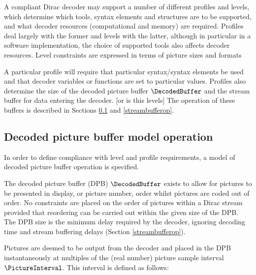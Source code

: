 \label{profilelevel}

A compliant Dirac decoder may support a number of different profiles and levels, which determine 
which tools, syntax elements and structures are to be supported, and what decoder resources 
(computational and memory) are required. Profiles deal largely with the former and levels
with the latter, although in particular in a software implementation, the choice of supported tools
also affects decoder resources. Level constraints are expressed in terms of picture sizes and 
formats 

A particular profile will require that particular syntax/syntax elements be used and that decoder
variables or functions are set to particular values. Profiles also determine the size of the
decoded picture buffer $\DecodedBuffer$ and the stream buffer for data entering the decoder. [or is this levels]
The operation of these buffers is described in Sections \ref{decodedbufferop} and \ref{streambufferop}.

\begin{comment}
Main=0, $is\_low\_delay()==false$, $using\_ac()==\true$, $using\_mc()==\true$
Simple=1, $is\_low\_delay()==false$, $using\_ac()==\false$, $using\_mc()==\false$
Link=2, $is\_low\_delay()==true$, $using\_ac()==\false$, $using\_mc()==\false$
Wireless=3, $is\_low\_delay()==true$, $using\_ac()==\true$, $using\_mc()==\true$

If we have Simple or Link then $using\_ac()$ is false and $using\_inter()$ is false.
\end{comment}

\subsection{Decoded picture buffer model operation}
\label{decodedbufferop}

In order to define compliance with level and profile requirements, a model of decoded picture buffer
operation is specified.

The decoded picture buffer (DPB) $\DecodedBuffer$ exists to allow for pictures to be presented in display, or 
picture number, order whilst pictures are coded out of order. No constraints are placed on the order
of pictures within a Dirac stream provided that reordering can be carried out within the given size of
the DPB. The DPB size is the minimum delay required by the decoder, ignoring decoding time and stream
buffering delays (Section \ref{streambufferop}).

Pictures are deemed to be output from the decoder and placed in the DPB instantaneously at multiples
of the (real number) picture sample interval $\PictureInterval$. This interval is defined as follows:


